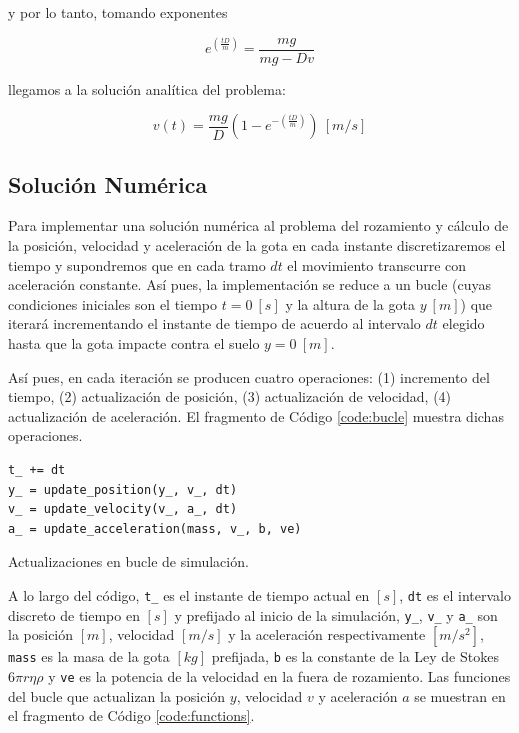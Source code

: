 \documentclass[journal]{IEEEtran}
\newenvironment{code}{\captionsetup{type=listing}}{\par\addvspace{\baselineskip}}
\begin{document}
y por lo tanto, tomando exponentes

\begin{equation}
  e^(\displaystyle\frac{tD}{m}) = \displaystyle\frac{mg}{mg - Dv}
\end{equation}

llegamos a la solución analítica del problema:

\begin{equation}
  v(t) = \displaystyle\frac{mg}{D}(1 - e^{-(\displaystyle\frac{tD}{m})})~[m/s]
\end{equation}



\subsection{Solución Numérica}

Para implementar una solución numérica al problema del rozamiento y cálculo de la posición, velocidad y aceleración de la gota en cada instante discretizaremos el tiempo y supondremos que en cada tramo $dt$ el movimiento transcurre con aceleración constante. Así pues, la implementación se reduce a un bucle (cuyas condiciones iniciales son el tiempo $t = 0~[s]$ y la altura de la gota $y~[m]$) que iterará incrementando el instante de tiempo de acuerdo al intervalo $dt$ elegido hasta que la
gota impacte contra el suelo $y = 0~[m]$.

Así pues, en cada iteración se producen cuatro operaciones: (1) incremento del tiempo, (2) actualización de posición, (3) actualización de velocidad, (4) actualización de aceleración. El fragmento de Código \ref{code:bucle} muestra dichas operaciones.

\bigskip

\begin{code}
  \begin{verbatim}
t_ += dt
y_ = update_position(y_, v_, dt)
v_ = update_velocity(v_, a_, dt)
a_ = update_acceleration(mass, v_, b, ve)
  \end{verbatim}
  \caption{Actualizaciones en bucle de simulación.}
  \label{code:bucle}
\end{code}

A lo largo del código, \texttt{t_} es el instante de tiempo actual en $[s]$, \texttt{dt} es el intervalo discreto de tiempo en $[s]$ y prefijado al inicio de la simulación, \texttt{y_}, \texttt{v_} y \texttt{a_} son la posición $[m]$, velocidad $[m/s]$ y la aceleración respectivamente $[m/s^2]$, \texttt{mass} es la masa de la gota $[kg]$ prefijada, \texttt{b} es la constante de la Ley de Stokes
$6\pi r\eta\rho$ y \texttt{ve} es la potencia de la velocidad en la fuera de rozamiento. Las funciones del bucle que actualizan la posición $y$, velocidad $v$ y aceleración $a$ se muestran en el fragmento de Código \ref{code:functions}.
\end{document}
